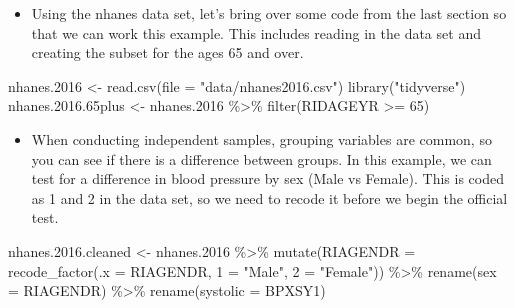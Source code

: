 \documentclass[
  letterpaper,
  DIV=11,
  numbers=noendperiod]{scrreprt}
\newenvironment{Shaded}{\begin{snugshade}}{\end{snugshade}}
\newcommand{\AttributeTok}[1]{\textcolor[rgb]{0.40,0.45,0.13}{#1}}
\newcommand{\DecValTok}[1]{\textcolor[rgb]{0.68,0.00,0.00}{#1}}
\newcommand{\FloatTok}[1]{\textcolor[rgb]{0.68,0.00,0.00}{#1}}
\newcommand{\FunctionTok}[1]{\textcolor[rgb]{0.28,0.35,0.67}{#1}}
\newcommand{\NormalTok}[1]{\textcolor[rgb]{0.00,0.23,0.31}{#1}}
\newcommand{\OtherTok}[1]{\textcolor[rgb]{0.00,0.23,0.31}{#1}}
\newcommand{\SpecialCharTok}[1]{\textcolor[rgb]{0.37,0.37,0.37}{#1}}
\newcommand{\StringTok}[1]{\textcolor[rgb]{0.13,0.47,0.30}{#1}}
\providecommand{\tightlist}{%
  \setlength{\itemsep}{0pt}\setlength{\parskip}{0pt}}\usepackage{longtable,booktabs,array}
\begin{document}
\begin{itemize}
\tightlist
\item
  Using the nhanes data set, let's bring over some code from the last
  section so that we can work this example. This includes reading in the
  data set and creating the subset for the ages 65 and over.
\end{itemize}

\begin{Shaded}
\begin{Highlighting}[]
\NormalTok{nhanes}\FloatTok{.2016} \OtherTok{\textless{}{-}} \FunctionTok{read.csv}\NormalTok{(}\AttributeTok{file =} \StringTok{"data/nhanes2016.csv"}\NormalTok{)}
\FunctionTok{library}\NormalTok{(}\StringTok{"tidyverse"}\NormalTok{)}
\NormalTok{nhanes.}\FloatTok{2016.65}\NormalTok{plus }\OtherTok{\textless{}{-}}\NormalTok{ nhanes}\FloatTok{.2016} \SpecialCharTok{\%\textgreater{}\%}
    \FunctionTok{filter}\NormalTok{(RIDAGEYR }\SpecialCharTok{\textgreater{}=} \DecValTok{65}\NormalTok{)}
\end{Highlighting}
\end{Shaded}

\begin{itemize}
\tightlist
\item
  When conducting independent samples, grouping variables are common, so
  you can see if there is a difference between groups. In this example,
  we can test for a difference in blood pressure by sex (Male vs
  Female). This is coded as 1 and 2 in the data set, so we need to
  recode it before we begin the official test.
\end{itemize}

\begin{Shaded}
\begin{Highlighting}[]
\NormalTok{nhanes.}\FloatTok{2016.}\NormalTok{cleaned }\OtherTok{\textless{}{-}}\NormalTok{ nhanes}\FloatTok{.2016} \SpecialCharTok{\%\textgreater{}\%}
    \FunctionTok{mutate}\NormalTok{(}\AttributeTok{RIAGENDR =} \FunctionTok{recode\_factor}\NormalTok{(}\AttributeTok{.x =}\NormalTok{ RIAGENDR, }\StringTok{\textasciigrave{}}\AttributeTok{1}\StringTok{\textasciigrave{}} \OtherTok{=} \StringTok{"Male"}\NormalTok{, }\StringTok{\textasciigrave{}}\AttributeTok{2}\StringTok{\textasciigrave{}} \OtherTok{=} \StringTok{"Female"}\NormalTok{)) }\SpecialCharTok{\%\textgreater{}\%}
    \FunctionTok{rename}\NormalTok{(}\AttributeTok{sex =}\NormalTok{ RIAGENDR) }\SpecialCharTok{\%\textgreater{}\%}
    \FunctionTok{rename}\NormalTok{(}\AttributeTok{systolic =}\NormalTok{ BPXSY1)}
\end{Highlighting}
\end{Shaded}
\end{document}
